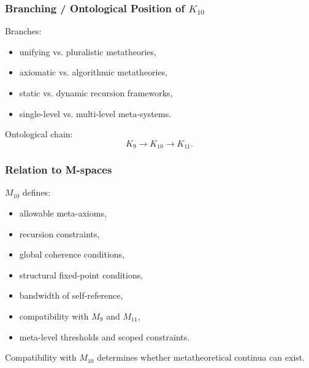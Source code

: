 \subsubsection{Branching / Ontological Position of $K_{10}$}

Branches:
\begin{itemize}
    \item unifying vs. pluralistic metatheories,
    \item axiomatic vs. algorithmic metatheories,
    \item static vs. dynamic recursion frameworks,
    \item single-level vs. multi-level meta-systems.
\end{itemize}

Ontological chain:
\[
K_9 \to K_{10} \to K_{11}.
\]

\subsubsection{Relation to M-spaces}

$M_{10}$ defines:
\begin{itemize}
    \item allowable meta-axioms,
    \item recursion constraints,
    \item global coherence conditions,
    \item structural fixed-point conditions,
    \item bandwidth of self-reference,
    \item compatibility with $M_9$ and $M_{11}$,
    \item meta-level thresholds and scoped constraints.
\end{itemize}

Compatibility with $M_{10}$ determines whether metatheoretical continua can exist.
